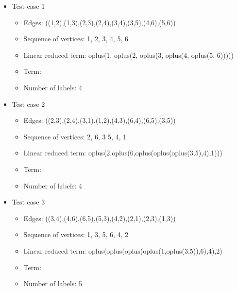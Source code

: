 \documentclass[a4paper, 12pt]{article}
\begin{document}
\begin{itemize}

\item Test case 1
	\begin{itemize}
		\item Edges: ((1,2),(1,3),(2,3),(2,4),(3,4),(3,5),(4,6),(5,6))
		\item Sequence of vertices: 1, 2, 3, 4, 5, 6
		\item Linear reduced term: oplus(1, oplus(2, oplus(3, oplus(4, oplus(5, 6)))))
		\item Term: 
		\item Number of labels: 4
	\end{itemize}

\item Test case 2
	\begin{itemize}
		\item Edges: ((2,3),(2,4),(3,1),(1,2),(4,3),(6,4),(6,5),(3,5))
		\item Sequence of vertices: 2, 6, 3 5, 4, 1
		\item Linear reduced term: oplus(2,oplus(6,oplus(oplus(oplus(3,5),4),1)))
		\item Term: 
		\item Number of labels: 4
	\end{itemize}

\item Test case 3
	\begin{itemize}
		\item Edges: ((3,4),(4,6),(6,5),(5,3),(4,2),(2,1),(2,3),(1,3))
		\item Sequence of vertices: 1, 3, 5, 6, 4, 2
		\item Linear reduced term: oplus(oplus(oplus(oplus(1,oplus(3,5)),6),4),2)
		\item Term: 
		\item Number of labels: 5
	\end{itemize}


\end{itemize}
\end{document}
